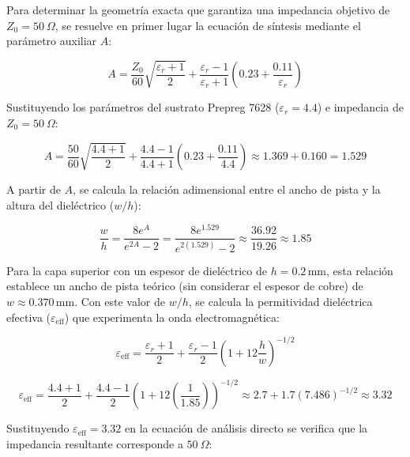 \documentclass[11pt,a4paper,twoside]{report}
\begin{document}
	Para determinar la geometría exacta que garantiza una impedancia objetivo de $Z_0 = 50\ \Omega$, se resuelve en primer lugar la ecuación de síntesis mediante el parámetro auxiliar $A$:
	
	\begin{equation}
		A = \frac{Z_0}{60} \sqrt{\frac{\varepsilon_r + 1}{2}} + \frac{\varepsilon_r - 1}{\varepsilon_r + 1} \left( 0.23 + \frac{0.11}{\varepsilon_r} \right)
	\end{equation}
	
	Sustituyendo los parámetros del sustrato Prepreg 7628 ($\varepsilon_r = 4.4$) e impedancia de $Z_0 = 50\ \Omega$:
	
	\begin{equation}
		A = \frac{50}{60} \sqrt{\frac{4.4 + 1}{2}} + \frac{4.4 - 1}{4.4 + 1} \left( 0.23 + \frac{0.11}{4.4} \right) \approx 1.369 + 0.160 = 1.529
	\end{equation}
	
	A partir de $A$, se calcula la relación adimensional entre el ancho de pista y la altura del dieléctrico ($w/h$):
	
	\begin{equation}
		\frac{w}{h} = \frac{8 e^A}{e^{2A} - 2} = \frac{8 e^{1.529}}{e^{2(1.529)} - 2} \approx \frac{36.92}{19.26} \approx 1.85
	\end{equation}
	
	Para la capa superior con un espesor de dieléctrico de $h = 0.2\,\mathrm{mm}$, esta relación establece un ancho de pista teórico (sin considerar el espesor de cobre) de $w \approx 0.370\,\mathrm{mm}$. Con este valor de $w/h$, se calcula la permitividad dieléctrica efectiva ($\varepsilon_{\mathrm{eff}}$) que experimenta la onda electromagnética:
	
	\begin{equation}
		\varepsilon_{\mathrm{eff}} = \frac{\varepsilon_r + 1}{2} + \frac{\varepsilon_r - 1}{2} \left( 1 + 12 \frac{h}{w} \right)^{-1/2}
	\end{equation}
	
	\begin{equation}
		\varepsilon_{\mathrm{eff}} = \frac{4.4 + 1}{2} + \frac{4.4 - 1}{2} \left( 1 + 12 \left( \frac{1}{1.85} \right) \right)^{-1/2} \approx 2.7 + 1.7 (7.486)^{-1/2} \approx 3.32
	\end{equation}
	
	Sustituyendo $\varepsilon_{\mathrm{eff}} = 3.32$ en la ecuación de análisis directo se verifica que la impedancia resultante corresponde a $50\ \Omega$:
	
\end{document}
